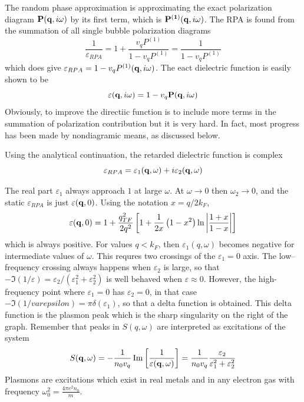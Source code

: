 The random phase approximation is approximating the exact polarization diagram $\mathbf{P}(\mathbf{q},i\omega)$ by its first term, which is $\mathbf{P^{(1)}}(\mathbf{q},i\omega)$.
The RPA is found from the summation of all single bubble polarization diagrams
\begin{equation}
    \frac{1}{\varepsilon_{RPA}} = 1 + \frac{v_q P^{(1)}}{1 - v_q P^{(1)}} = \frac{1}{1 - v_q P^{(1)}}   \label{5.161}
\end{equation}
which does give $\varepsilon_{RPA} = 1 - v_q P^{(1)}(\mathbf{q},i\omega)$.
The eact dielectric function is easily shown to be
\begin{equation}
    \varepsilon(\mathbf{q},i\omega) = 1 - v_q \mathbf{P}(\mathbf{q},i\omega)  \label{5.162}
\end{equation}
Obviously, to improve the directiic function is to include more terms in the summation of polarization contribution but it is very hard.
In fact, most progress has been made by nondiagramic means, as discussed below.

Using the analytical continuation, the retarded dielectric function is complex
\begin{equation}
    \varepsilon_{RPA} = \varepsilon_1(\mathbf{q},\omega) + i \varepsilon_2(\mathbf{q},\omega)    \label{5.163}
\end{equation}

The real part $\varepsilon_1$ always approach $1$ at large $\omega$.
At $\omega \to 0$ then $\omega_2 \to 0$, and the static $\varepsilon_{RPA}$ is just $\varepsilon(\mathbf{q},0)$.
Using the notation $x=q/2k_F$,
\begin{equation}
    \varepsilon(\mathbf{q},0) = 1 + \frac{q^2_{TF}}{2q^2} \left[ 1 + \frac{1}{2x} \left( 1 - x^2 \right) \ln \abs{ \frac{1+x}{1-x} } \right]   \label{5.166}
\end{equation}
which is always positive.
For values $q<k_F$, then $\varepsilon_1(q,\omega)$ becomes negative for intermediate values of $\omega$.
This requres two crossings of the $\varepsilon_1 = 0 $ axis.
The low--frequency crossing always happens when $\varepsilon_2$ is large, so that $-\Im (1/\varepsilon) = \varepsilon_2 / (\varepsilon_1^2 + \varepsilon_2^2 )$ is well behaved when $\varepsilon \approx 0$.
However, the high-frequency point where $\varepsilon_1=0$ has $\varepsilon_2=0$, in that case $ - \Im(1/varepsilon) = \pi \delta(\varepsilon_1)$, so that a delta function is obtained.
This delta function is the plasmon peak which is the sharp singularity on the right of the graph.
Remember that peaks in $S(q,\omega)$ are interpreted as excitations of the system
\begin{equation}
    S(\mathbf{q},\omega) = - \frac{1}{n_0 v_q} \Im \left[ \frac{1}{\varepsilon(\mathbf{q},\omega)} \right] = \frac{1}{n_0 v_q} \frac{\varepsilon_2}{\varepsilon_1^2 + \varepsilon_2^2}    \label{5.167}
\end{equation}
Plasmons are excitations which exist in real metals and in any electron gas with frequency $\omega^2_0 = \frac{4\pi e^2 n_0}{m}$.

